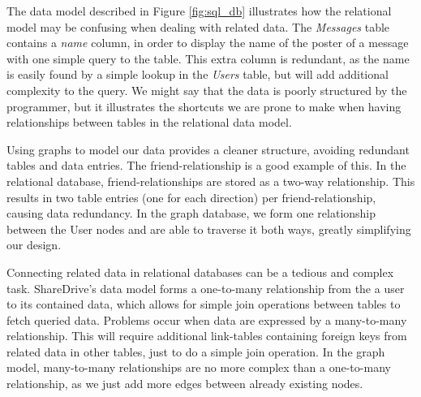 \documentclass[a4paper, 12pt, conference]{IEEEtran}
\begin{document}
The data model described in Figure \ref{fig:sql_db} illustrates how the relational model may be confusing when dealing with related data. 
The \textit{Messages} table contains a \textit{name} column, in order to display the name of the poster of a message with one simple query to the table. 
This extra column is redundant, as the name is easily found by a simple lookup in the \textit{Users} table, but will add additional complexity to the query. 
We might say that the data is poorly structured by the programmer, but it illustrates the shortcuts we are prone to make when having relationships between tables in the relational data model.

Using graphs to model our data provides a cleaner structure, avoiding redundant tables and data entries. 
The friend-relationship is a good example of this. 
In the relational database, friend-relationships are stored as a two-way relationship. 
This results in two table entries (one for each direction) per friend-relationship, causing data redundancy. 
In the graph database, we form one relationship between the User nodes and are able to traverse it both ways, greatly simplifying our design.

Connecting related data in relational databases can be a tedious and complex task. ShareDrive's data model forms a one-to-many relationship from the a user to its contained data, which allows for simple join operations between tables to fetch queried data. 
Problems occur when data are expressed by a many-to-many relationship. 
This will require additional link-tables containing foreign keys from related data in other tables, just to do a simple join operation. 
In the graph model, many-to-many relationships are no more complex than a one-to-many relationship, as we just add more edges between already existing nodes.
\end{document}
